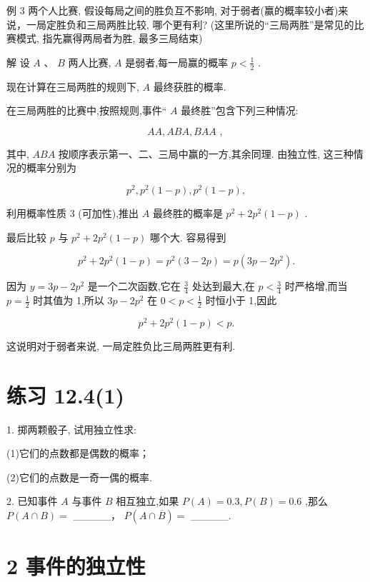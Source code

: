 \documentclass[10pt]{article}
\begin{document}
例 3 两个人比赛, 假设每局之间的胜负互不影响, 对于弱者(赢的概率较小者)来说，一局定胜负和三局两胜比较, 哪个更有利? (这里所说的“三局两胜”是常见的比赛模式, 指先赢得两局者为胜, 最多三局结束)

解 设 \(A\text{ 、 }B\) 两人比赛, \(A\) 是弱者,每一局赢的概率 \(p < \frac{1}{2}\) .



现在计算在三局两胜的规则下, \(A\) 最终获胜的概率.

在三局两胜的比赛中,按照规则,事件“ \(A\) 最终胜”包含下列三种情况:

\[
{AA},{ABA},{BAA}\text{ , }
\]

其中, \({ABA}\) 按顺序表示第一、二、三局中赢的一方,其余同理. 由独立性, 这三种情况的概率分别为

\[
{p}^{2},{p}^{2}\left( {1 - p}\right) ,{p}^{2}\left( {1 - p}\right) ,
\]

利用概率性质 3 (可加性),推出 \(A\) 最终胜的概率是 \({p}^{2} + 2{p}^{2}\left( {1 - p}\right)\) .

最后比较 \(p\) 与 \({p}^{2} + 2{p}^{2}\left( {1 - p}\right)\) 哪个大. 容易得到

\[
{p}^{2} + 2{p}^{2}\left( {1 - p}\right)  = {p}^{2}\left( {3 - {2p}}\right)  = p\left( {{3p} - 2{p}^{2}}\right) .
\]

因为 \(y = {3p} - 2{p}^{2}\) 是一个二次函数,它在 \(\frac{3}{4}\) 处达到最大,在 \(p < \frac{3}{4}\) 时严格增,而当 \(p = \frac{1}{2}\) 时其值为 1,所以 \({3p} - 2{p}^{2}\) 在 \(0 < p < \frac{1}{2}\) 时恒小于 1,因此

\[
{p}^{2} + 2{p}^{2}\left( {1 - p}\right)  < p.
\]

这说明对于弱者来说, 一局定胜负比三局两胜更有利.

\section*{练习 12.4(1)}

1. 掷两颗骰子, 试用独立性求:

(1)它们的点数都是偶数的概率；

(2)它们的点数是一奇一偶的概率.

2. 已知事件 \(A\) 与事件 \(B\) 相互独立,如果 \(P\left( A\right)  = {0.3},P\left( B\right)  = {0.6}\) ,那么 \(P\left( {A \cap  B}\right)  =\) \_\_\_\_\_， \(P\left( {A \cap  \overline{B}}\right)  =\) \_\_\_\_\_.

\section*{2 事件的独立性}
\end{document}

